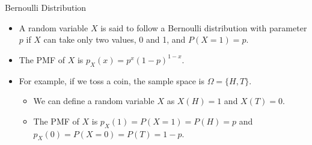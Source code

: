 \documentclass[handout]{beamer}
\begin{document}
\begin{frame}{Bernoulli Distribution}
    \begin{itemize}
        \item A random variable $X$ is said to follow a Bernoulli distribution with parameter $p$ if $X$ can take only two values, 0 and 1, and $P(X = 1) = p$.
        \item The PMF of $X$ is $p_X(x) = p^x(1 - p)^{1 - x}$.
        \item For example, if we toss a coin, the sample space is  $\Omega = \{H, T\}$. 
        \begin{itemize}
            \item We can define a random variable $X$ as $X(H) = 1$ and $X(T) = 0$.
            \item The PMF of $X$ is $p_X(1) = P(X = 1) = P(H) = p$ and $p_X(0) = P(X = 0) = P(T) = 1 - p$.
        \end{itemize}
    \end{itemize}

    \begin{figure}
        
 
        
        
         \end{figure}
      
    
\end{frame}
\end{document}
